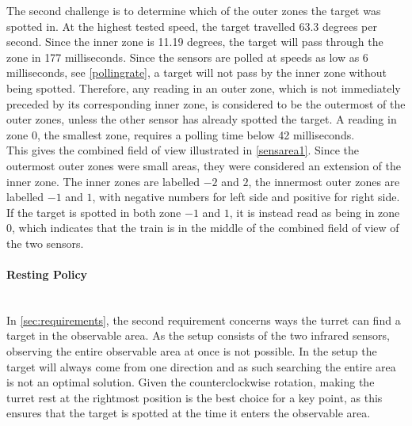 The second challenge is to determine which of the outer zones the target was spotted in. At the highest tested speed, the target travelled 63.3 degrees per second. Since the inner zone is 11.19 degrees, the target will pass through the zone in 177 milliseconds. Since the sensors are polled at speeds as low as 6 milliseconds, see \cref{pollingrate}, a target will not pass by the inner zone without being spotted. Therefore, any reading in an outer zone, which is not immediately preceded by its corresponding inner zone, is considered to be the outermost of the outer zones, unless the other sensor has already spotted the target. A reading in zone 0, the smallest zone, requires a polling time below 42 milliseconds. \\

This gives the combined field of view illustrated in \cref{sensarea1}. Since the outermost outer zones were small areas, they were considered an extension of the inner zone. The inner zones are labelled $-2$ and $2$, the innermost outer zones are labelled $-1$ and $1$, with negative numbers for left side and positive for right side. If the target is spotted in both zone $-1$ and $1$, it is instead read as being in zone $0$, which indicates that the train is in the middle of the combined field of view of the two sensors.



\paragraph{Resting Policy} ~\\
In \cref{sec:requirements}, the second requirement concerns ways the turret can find a target in the observable area. As the setup consists of the two infrared sensors, observing the entire observable area at once is not possible. In the setup the target will always come from one direction and as such searching the entire area is not an optimal solution. Given the counterclockwise rotation, making the turret rest at the rightmost position is the best choice for a key point, as this ensures that the target is spotted at the time it enters the observable area.
